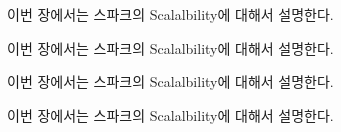 \fi




\ifkor
이번 장에서는 스파크의 Scalalbility에 대해서 설명한다.
\else

\fi




\ifkor
이번 장에서는 스파크의 Scalalbility에 대해서 설명한다.
\else

\fi




\ifkor
이번 장에서는 스파크의 Scalalbility에 대해서 설명한다.
\else

\fi



\ifkor
이번 장에서는 스파크의 Scalalbility에 대해서 설명한다.
\else

\fi
